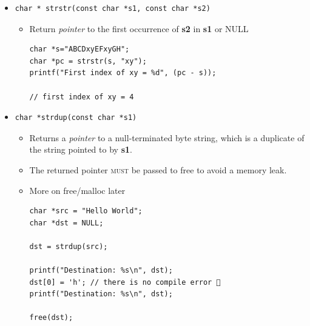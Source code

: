 \documentclass{../c-lecture}
\begin{document}
\begin{frame}[fragile]
  \begin{itemize}
    \item
    \begin{verbatim}
char * strstr(const char *s1, const char *s2)
    \end{verbatim}

    \begin{itemize}
      \item
        Return \textit{\color{Cyan} pointer} to the first occurrence of
        \textbf{\color{LimeGreen} s2} in
        \textbf{\color{YellowOrange} s1} or
        \textsc{\color{Purple} NULL}

      \begin{verbatim}
char *s="ABCDxyEFxyGH";
char *pc = strstr(s, "xy");
printf("First index of xy = %d", (pc - s));

// first index of xy = 4
      \end{verbatim}
    \end{itemize}
  \end{itemize}
\end{frame}

\begin{frame}[fragile]
  \begin{itemize}
    \item
    \begin{verbatim}
char *strdup(const char *s1)
    \end{verbatim}

    \begin{itemize}
      \item
        Returns a \textit{\color{Cyan} pointer} to a null-terminated
        byte string, which is a duplicate of the string pointed to by
        \textbf{\color{YellowOrange} s1}.

      \item
        The returned pointer \textsc{\color{Purple} must} be passed to free to avoid a memory leak.

      \item More on free/malloc later
      \begin{verbatim}
char *src = "Hello World";
char *dst = NULL;

dst = strdup(src);

printf("Destination: %s\n", dst);
dst[0] = 'h'; // there is no compile error 🕺
printf("Destination: %s\n", dst);

free(dst);
      \end{verbatim}
    \end{itemize}
  \end{itemize}
\end{frame}
\end{document}

